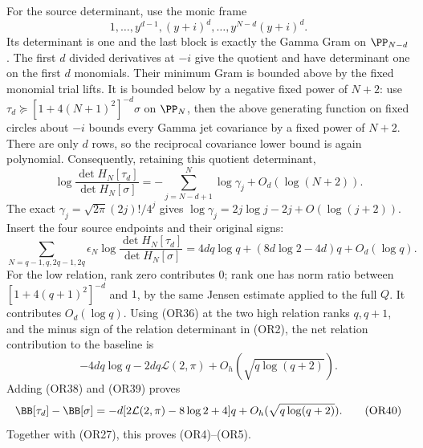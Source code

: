 \documentclass[11pt,a4paper]{article}
\begin{document}
For the source determinant, use the monic frame
\[
 1,\ldots,y^{d-1},(y+i)^d,\ldots,y^{N-d}(y+i)^d .
\]
Its determinant is one and the last block is exactly the Gamma
Gram on \(\PP_{N-d}\).
The first \(d\) divided derivatives at \(-i\) give the quotient
and have determinant one on the first \(d\) monomials.
Their minimum Gram is bounded above by the fixed monomial
trial lifts.  It is bounded below by a negative fixed power
of \(N+2\): use
\(\tau_d\succeq[1+4(N+1)^2]^{-d}\sigma\) on \(\PP_N\),
then the above generating function on fixed circles about
\(-i\) bounds every Gamma jet covariance by a fixed power
of \(N+2\).  There are only \(d\) rows, so the reciprocal
covariance lower bound is again polynomial.
Consequently, retaining this quotient determinant,
\[
 \log\frac{\det H_N[\tau_d]}{\det H_N[\sigma]}
 =-\sum_{j=N-d+1}^N\log\gamma_j+O_d(\log(N+2)).       \tag{OR37}
\]
The exact \(\gamma_j=\sqrt{2\pi}(2j)!/4^j\) gives
\(\log\gamma_j=2j\log j-2j+O(\log(j+2))\).
Insert the four source endpoints and their original signs:
\[
 \sum_{N=q-1,q,2q-1,2q}\epsilon_N
 \log\frac{\det H_N[\tau_d]}{\det H_N[\sigma]}
 =4dq\log q+(8d\log2-4d)q+O_d(\log q).              \tag{OR38}
\]
For the low relation, rank zero contributes \(0\); rank one
has norm ratio between \([1+4(q+1)^2]^{-d}\) and \(1\), by
the same Jensen estimate applied to the full \(Q\).
It contributes \(O_d(\log q)\).
Using (OR36) at the two high relation ranks \(q,q+1\),
and the minus sign of the relation determinant in (OR2),
the net relation contribution to the baseline is
\[
 -4dq\log q-2dq\mathcal L(2,\pi)
 +O_h(\sqrt{q\log(q+2)}).                            \tag{OR39}
\]
Adding (OR38) and (OR39) proves
\[
 \BB[\tau_d]-\BB[\sigma]
 =-d[2\mathcal L(2,\pi)-8\log2+4]q
 +O_h(\sqrt{q\log(q+2)}).                            \tag{OR40}
\]
Together with (OR27), this proves (OR4)--(OR5).
\end{document}
